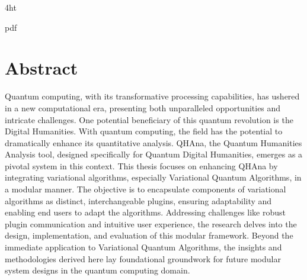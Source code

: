 \documentclass[
  a4paper,  %
  twoside,  %
  bibliography=totoc,
  headsepline,
  cleardoublepage=empty,
  parskip=half,
  draft=false
]{scrbook}
\begin{document}
\iftex4ht
  \Configure{$}{\PicMath}{\EndPicMath}{}

  {pdf}
  {%
  }
\fi



\Titelblatt

\pagestyle{preamble}
\renewcommand*{\chapterpagestyle}{preamble}



\section*{Abstract}
Quantum computing, with its transformative processing capabilities, has ushered in a new computational era, presenting both unparalleled opportunities and intricate challenges.
One potential beneficiary of this quantum revolution is the Digital Humanities. With quantum computing, the field has the potential to dramatically enhance its quantitative analysis.
QHAna, the Quantum Humanities Analysis tool, designed specifically for Quantum Digital Humanities, emerges as a pivotal system in this context.
This thesis focuses on enhancing QHAna by integrating variational algorithms, especially Variational Quantum Algorithms, in a modular manner.
The objective is to encapsulate components of variational algorithms as distinct, interchangeable plugins, ensuring adaptability and enabling end users to adapt the algorithms.
Addressing challenges like robust plugin communication and intuitive user experience, the research delves into the design, implementation, and evaluation of this modular framework.
Beyond the immediate application to Variational Quantum Algorithms, the insights and methodologies derived here lay foundational groundwork for future modular system designs in the quantum computing domain.
\end{document}
